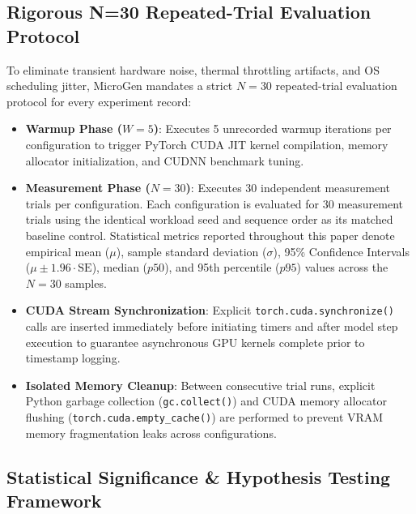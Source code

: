 \subsection{Rigorous N=30 Repeated-Trial Evaluation Protocol}
\label{sec:meth_protocol}

To eliminate transient hardware noise, thermal throttling artifacts, and OS scheduling jitter, \textsf{MicroGen} mandates a strict $N=30$ repeated-trial evaluation protocol for every experiment record:
\begin{itemize}
    \item \textbf{Warmup Phase ($W=5$)}: Executes 5 unrecorded warmup iterations per configuration to trigger PyTorch CUDA JIT kernel compilation, memory allocator initialization, and CUDNN benchmark tuning.
    \item \textbf{Measurement Phase ($N=30$)}: Executes 30 independent measurement trials per configuration. Each configuration is evaluated for 30 measurement trials using the identical workload seed and sequence order as its matched baseline control. Statistical metrics reported throughout this paper denote empirical mean ($\mu$), sample standard deviation ($\sigma$), 95\% Confidence Intervals ($\mu \pm 1.96 \cdot \text{SE}$), median ($p50$), and 95th percentile ($p95$) values across the $N=30$ samples.
    \item \textbf{CUDA Stream Synchronization}: Explicit \texttt{torch.cuda.synchronize()} calls are inserted immediately before initiating timers and after model step execution to guarantee asynchronous GPU kernels complete prior to timestamp logging.
    \item \textbf{Isolated Memory Cleanup}: Between consecutive trial runs, explicit Python garbage collection (\texttt{gc.collect()}) and CUDA memory allocator flushing (\texttt{torch.cuda.empty\_cache()}) are performed to prevent VRAM memory fragmentation leaks across configurations.
\end{itemize}

\subsection{Statistical Significance \& Hypothesis Testing Framework}
\label{sec:meth_stats_testing}

